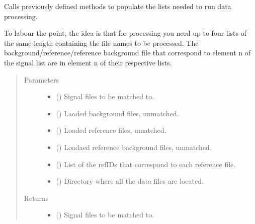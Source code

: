 \documentclass[a4paper,10pt,english]{sphinxmanual}
\begin{document}
\begin{fulllineitems}
\begin{fulllineitems}
\sphinxAtStartPar
Calls previously defined methods to populate the lists needed to run data processing.

\sphinxAtStartPar
To labour the point, the idea is that for processing you need up to four lists of the same length
containing the file names to be processed. The background/reference/reference background file that
correspond to element n of the signal list are in element n of their respective lists.
\begin{quote}\begin{description}
\item[{Parameters}] \leavevmode\begin{itemize}
\item {} 
\sphinxAtStartPar
{} () \textendash{} Signal files to be matched to.

\item {} 
\sphinxAtStartPar
{} () \textendash{} Laoded background files, unmatched.

\item {} 
\sphinxAtStartPar
{} () \textendash{} Loaded reference files, umatched.

\item {} 
\sphinxAtStartPar
{} () \textendash{} Loadaed reference background files, unmatched.

\item {} 
\sphinxAtStartPar
{} () \textendash{} List of the refIDs that correspond to each reference file.

\item {} 
\sphinxAtStartPar
{} () \textendash{} Directory where all the data files are located.

\end{itemize}

\item[{Returns}] \leavevmode
\sphinxAtStartPar
\begin{itemize}
\item {} 
\sphinxAtStartPar
{} () \textendash{} Signal files to be matched to.


\end{itemize}
\end{description}
\end{quote}
\end{fulllineitems}
\end{fulllineitems}
\end{document}
